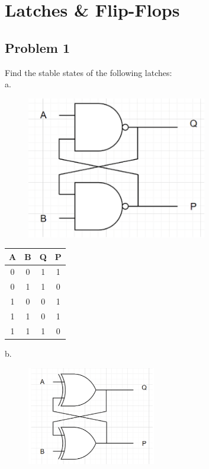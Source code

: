 \documentclass{article}
\begin{document}
\newpage
\section*{Latches \& Flip-Flops}
\subsection*{Problem 1}
Find the stable states of the following latches: \\

a.
    \begin{figure}[!h]
        \centering
        \includegraphics[width=0.7\textwidth]{figures/latch1a.png}
    \end{figure}

    \begin{table}[!h]
    \centering
\begin{tabular}{|c|c|c|c|}
\hline
\textbf{A} & \textbf{B} & \textbf{Q} & \textbf{P} \\ \hline
0          & 0          & 1          & 1          \\ \hline
0          & 1          & 1          & 0          \\ \hline
1          & 0          & 0          & 1          \\ \hline
1          & 1          & 0          & 1          \\ \hline
1          & 1          & 1          & 0          \\ \hline
\end{tabular}
\end{table}

\newpage
b.
    \begin{figure}[!h]
        \centering
        \includegraphics[width=0.5\textwidth]{figures/latch1b.png}
    \end{figure}
\end{document}
